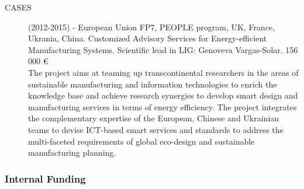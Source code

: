 \begin{description}
\item[CASES] (2012-2015) - European Union FP7, PEOPLE program, UK, France, Ukrania, China. Customized Advisory Services for Energy-efficient Manufacturing Systems. Scientific lead in LIG: Genoveva Vargas-Solar.  156 000 \euro\\
The project aims at teaming up transcontinental researchers in the areas of sustainable manufacturing and information technologies to enrich the knowledge base and achieve research synergies to develop smart design and manufacturing services in terms of energy efficiency. The project  integrates the complementary expertise of the European, Chinese and Ukrainian teams to devise ICT-based smart services and standards to address the multi-faceted requirements of global eco-design and sustainable manufacturing planning.

\end{description}

\subsubsection{Internal Funding}

